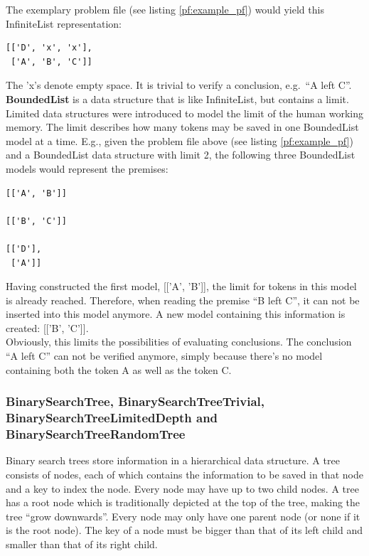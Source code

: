\documentclass[hidelinks]{scrartcl}
\begin{document}
\noindent The exemplary problem file (see listing \ref{pf:example_pf}) would yield this InfiniteList representation:

\begin{lstlisting}[caption=InfiniteList representation, label=inflist_example_pf, frame=single]
[['D', 'x', 'x'],
 ['A', 'B', 'C']]
\end{lstlisting}

The 'x's denote empty space. It is trivial to verify a conclusion, e.g.\ ``A left C''. \\

\textbf{BoundedList} is a data structure that is like InfiniteList, but contains a limit. Limited data structures were introduced to model the limit of the human working memory. The limit describes how many tokens may be saved in one BoundedList model at a time. E.g., given the problem file above (see listing \ref{pf:example_pf}) and a BoundedList data structure with limit 2, the following three BoundedList models would represent the premises:

\begin{lstlisting}[caption=BoundedList representation with limit 2, label=boundedlist_example_pf, frame=single]
[['A', 'B']]

[['B', 'C']]

[['D'],
 ['A']]
\end{lstlisting}

Having constructed the first model, [['A', 'B']], the limit for tokens in this model is already reached. Therefore, when reading the premise ``B left C'', it can not be inserted into this model anymore. A new model containing this information is created: [['B', 'C']].\\
Obviously, this limits the possibilities of evaluating conclusions. The conclusion ``A left C'' can not be verified anymore, simply because there's no model containing both the token A as well as the token C.

\subsubsection{BinarySearchTree, BinarySearchTreeTrivial, BinarySearchTreeLimitedDepth and BinarySearchTreeRandomTree}
Binary search trees store information in a hierarchical data structure. A tree consists of nodes, each of which contains the information to be saved in that node and a key to index the node. Every node may have up to two child nodes. A tree has a root node which is traditionally depicted at the top of the tree, making the tree ``grow downwards''. Every node may only have one parent node (or none if it is the root node). The key of a node must be bigger than that of its left child and smaller than that of its right child. \\
\end{document}
